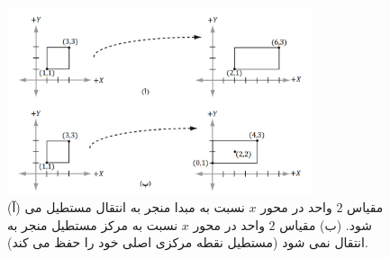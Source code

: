 {\begin{spacing}{1.5}
\begin{enumerate}[label=\textbf{\arabic*}.]
{                \begin{figure}[H]
                    \centering
                    \setlength{\belowcaptionskip}{-10pt}
                    \includegraphics[width=0.8\textwidth]{Images/4/3/4.Session.1.3.18}
                    \caption {(آ) مقیاس $2$ واحد در محور $x$ نسبت به مبدا منجر به انتقال مستطیل می شود.
(ب) مقیاس $2$ واحد در محور $x$ نسبت به مرکز مستطیل منجر به انتقال نمی شود (مستطیل نقطه مرکزی اصلی خود را حفظ می کند).}
                    \label{fig:4.Session.1.3.18}
                \end{figure}
            }
        \end{enumerate}
    \end{spacing}
}